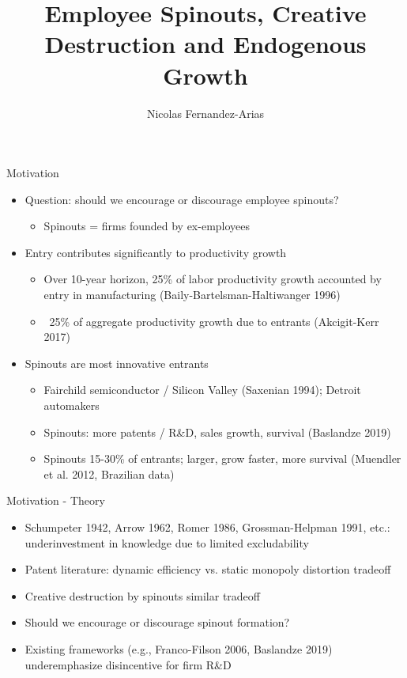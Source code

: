 \documentclass[english,usenames,dvipsnames]{beamer}
\title{Employee Spinouts, Creative Destruction and Endogenous Growth}
\author{Nicolas Fernandez-Arias}
\begin{document}
\maketitle

\begin{frame}{Motivation}
\begin{itemize}
	\item Question: should we encourage or discourage employee spinouts? 
	\begin{itemize}
		\item Spinouts = firms founded by ex-employees
	\end{itemize}
	\item Entry contributes significantly to productivity growth
	\begin{itemize}
		\item Over 10-year horizon, 25\% of labor productivity growth accounted by entry in manufacturing (Baily-Bartelsman-Haltiwanger 1996)
		\item ~25\% of aggregate productivity growth due to entrants (Akcigit-Kerr 2017)
	\end{itemize}
	\item Spinouts are most innovative entrants
	\begin{itemize}
		\item Fairchild semiconductor / Silicon Valley (Saxenian 1994); Detroit automakers
		\item Spinouts: more patents / R\&D, sales growth, survival (Baslandze 2019) 
		\item Spinouts 15-30\% of entrants; larger, grow faster, more survival (Muendler et al. 2012, Brazilian data)
	\end{itemize}
\end{itemize}
\end{frame}

\begin{frame}{Motivation - Theory}
\label{theory_big_picture}
\begin{itemize}
	\item Schumpeter 1942, Arrow 1962, Romer 1986, Grossman-Helpman 1991, etc.: \alert{underinvestment} in knowledge due to \alert{limited excludability}
	\item Patent literature: dynamic efficiency vs. static monopoly distortion tradeoff
	\item Creative destruction by spinouts similar tradeoff
	\item Should we encourage or discourage spinout formation?
	\item Existing frameworks (e.g., Franco-Filson 2006, Baslandze 2019) underemphasize disincentive for firm R\&D 
\end{itemize}
\end{frame}
\end{document}
